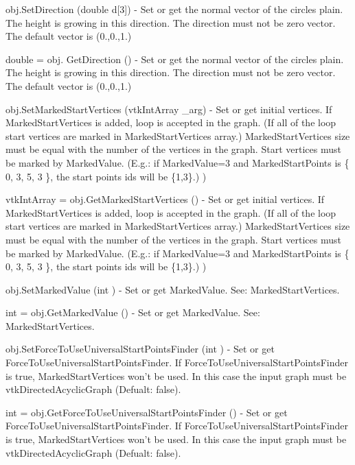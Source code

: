 \begin{DoxyItemize}
\item {\ttfamily obj.\-Set\-Direction (double d\mbox{[}3\mbox{]})} -\/ Set or get the normal vector of the circles plain. The height is growing in this direction. The direction must not be zero vector. The default vector is (0.,0.,1.)  
\item {\ttfamily double = obj. Get\-Direction ()} -\/ Set or get the normal vector of the circles plain. The height is growing in this direction. The direction must not be zero vector. The default vector is (0.,0.,1.)  
\item {\ttfamily obj.\-Set\-Marked\-Start\-Vertices (vtk\-Int\-Array \-\_\-arg)} -\/ Set or get initial vertices. If Marked\-Start\-Vertices is added, loop is accepted in the graph. (If all of the loop start vertices are marked in Marked\-Start\-Vertices array.) Marked\-Start\-Vertices size must be equal with the number of the vertices in the graph. Start vertices must be marked by Marked\-Value. (E.\-g.\-: if Marked\-Value=3 and Marked\-Start\-Points is \{ 0, 3, 5, 3 \}, the start points ids will be \{1,3\}.) )  
\item {\ttfamily vtk\-Int\-Array = obj.\-Get\-Marked\-Start\-Vertices ()} -\/ Set or get initial vertices. If Marked\-Start\-Vertices is added, loop is accepted in the graph. (If all of the loop start vertices are marked in Marked\-Start\-Vertices array.) Marked\-Start\-Vertices size must be equal with the number of the vertices in the graph. Start vertices must be marked by Marked\-Value. (E.\-g.\-: if Marked\-Value=3 and Marked\-Start\-Points is \{ 0, 3, 5, 3 \}, the start points ids will be \{1,3\}.) )  
\item {\ttfamily obj.\-Set\-Marked\-Value (int )} -\/ Set or get Marked\-Value. See\-: Marked\-Start\-Vertices.  
\item {\ttfamily int = obj.\-Get\-Marked\-Value ()} -\/ Set or get Marked\-Value. See\-: Marked\-Start\-Vertices.  
\item {\ttfamily obj.\-Set\-Force\-To\-Use\-Universal\-Start\-Points\-Finder (int )} -\/ Set or get Force\-To\-Use\-Universal\-Start\-Points\-Finder. If Force\-To\-Use\-Universal\-Start\-Points\-Finder is true, Marked\-Start\-Vertices won't be used. In this case the input graph must be vtk\-Directed\-Acyclic\-Graph (Defualt\-: false).  
\item {\ttfamily int = obj.\-Get\-Force\-To\-Use\-Universal\-Start\-Points\-Finder ()} -\/ Set or get Force\-To\-Use\-Universal\-Start\-Points\-Finder. If Force\-To\-Use\-Universal\-Start\-Points\-Finder is true, Marked\-Start\-Vertices won't be used. In this case the input graph must be vtk\-Directed\-Acyclic\-Graph (Defualt\-: false).  

\end{DoxyItemize}
